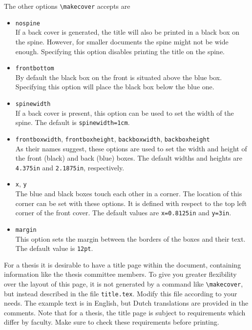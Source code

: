 The other options \texttt{\textbackslash makecover} accepts are
\begin{itemize}
\item\texttt{nospine} \\
    If a back cover is generated, the title will also be printed in a black box on the spine. However, for smaller documents the spine might not be wide enough. Specifying this option disables printing the title on the spine.
\item\texttt{frontbottom} \\
    By default the black box on the front is situated above the blue box. Specifying this option will place the black box below the blue one.
\item\texttt{spinewidth} \\
    If a back cover is present, this option can be used to set the width of the spine. The default is \texttt{spinewidth=1cm}.
\item\texttt{frontboxwidth}, \texttt{frontboxheight}, \texttt{backboxwidth}, \texttt{backboxheight} \\
    As their names suggest, these options are used to set the width and height of the front (black) and back (blue) boxes. The default widths and heights are \texttt{4.375in} and \texttt{2.1875in}, respectively.
\item\texttt{x}, \texttt{y} \\
    The blue and black boxes touch each other in a corner. The location of this corner can be set with these options. It is defined with respect to the top left corner of the front cover. The default values are \texttt{x=0.8125in} and \texttt{y=3in}.
\item\texttt{margin} \\
    This option sets the margin between the borders of the boxes and their text. The default value is \texttt{12pt}.
\end{itemize}

For a thesis it is desirable to have a title page within the document, containing information like the thesis committee members. To give you greater flexibility over the layout of this page, it is not generated by a command like \texttt{\textbackslash makecover}, but instead described in the file \texttt{title.tex}. Modify this file according to your needs. The example text is in English, but Dutch translations are provided in the comments. Note that for a thesis, the title page is subject to requirements which differ by faculty. Make sure to check these requirements before printing.

